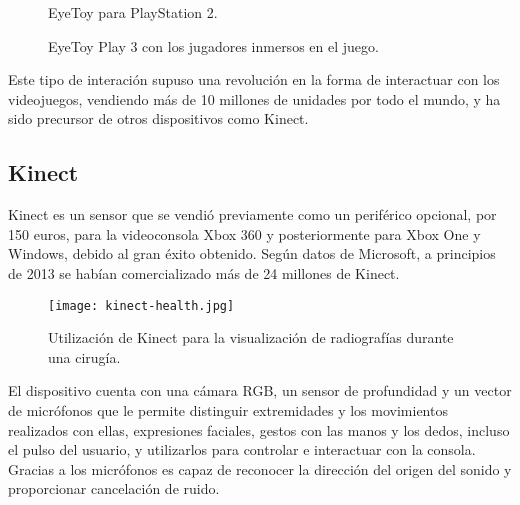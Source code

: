 \begin{figure}[b] %
\hfill
\begin{minipage}[t]{.45\textwidth}
\begin{center}
\caption{EyeToy para PlayStation 2.}
\label{eyeToy}
\end{center}
\end{minipage}
\hfill
\begin{minipage}[t]{.45\textwidth}
\begin{center}
\caption{EyeToy Play 3 con los jugadores inmersos en el juego.}
\label{eyetoy-game}
\end{center}
\end{minipage}
\hfill
\end{figure}

Este tipo de interación supuso una revolución en la forma de interactuar con los videojuegos, vendiendo más de 10 millones de unidades por todo el mundo, y ha sido precursor de otros dispositivos como Kinect.

\subsection{Kinect}
Kinect es un sensor que se vendió previamente como un periférico opcional, por 150 euros, para la videoconsola Xbox 360 y posteriormente para Xbox One y Windows, debido al gran éxito obtenido. Según datos de Microsoft, a principios de 2013 se habían comercializado más de 24 millones de Kinect. 

\begin{figure}
  \centering
  \texttt{[image: kinect-health.jpg]}
  \caption{Utilización de Kinect para la visualización de radiografías durante una cirugía.}
  \label{fig:kinect-health}
\end{figure}



El dispositivo cuenta con una cámara \acs{RGB}, un sensor de profundidad y un vector de micrófonos que le permite distinguir extremidades y los movimientos realizados con ellas, expresiones faciales, gestos con las manos y los dedos, incluso el pulso del usuario, y utilizarlos para controlar e interactuar con la consola. Gracias a los micrófonos es capaz de reconocer la dirección del origen del sonido y proporcionar cancelación de ruido.


